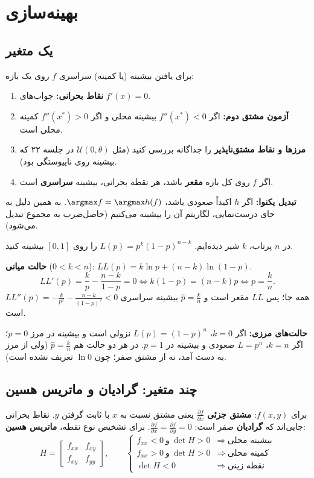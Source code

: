 \section{بهینه‌سازی}

\subsection{یک متغیر}
برای یافتن بیشینه (یا کمینه) سراسری $f$ روی یک بازه:
\begin{enumerate}
\item \textbf{نقاط بحرانی:} جواب‌های $f'(x)=0$.
\item \textbf{آزمون مشتق دوم:} اگر $f''(x^*)<0$ بیشینه محلی و اگر $f''(x^*)>0$ کمینه محلی است.
\item \textbf{مرزها و نقاط مشتق‌ناپذیر} را جداگانه بررسی کنید (مثل $\mathcal U(0,\theta)$ در جلسه ۲۲ که بیشینه روی ناپیوستگی بود).
\item اگر $f$ روی کل بازه \textbf{مقعر} باشد، هر نقطه بحرانی، بیشینه \textbf{سراسری} است.
\end{enumerate}
\textbf{تبدیل یکنوا:} اگر $h$ اکیداً صعودی باشد، $\argmax f=\argmax h(f)$. به همین دلیل به جای درست‌نمایی، لگاریتم آن را بیشینه می‌کنیم (حاصل‌ضرب به مجموع تبدیل می‌شود).

\begin{example}
در $n$ پرتاب، $k$ شیر دیده‌ایم. $L(p)=p^k(1-p)^{n-k}$ را روی $[0,1]$ بیشینه کنید.
\begin{solution}
\textbf{حالت میانی} ($0<k<n$): $LL(p)=k\ln p+(n-k)\ln(1-p)$.
\[
LL'(p)=\frac kp-\frac{n-k}{1-p}=0\iff k(1-p)=(n-k)p\iff p=\frac kn .
\]
$LL''(p)=-\frac{k}{p^2}-\frac{n-k}{(1-p)^2}<0$ همه جا؛ پس $LL$ مقعر است و $\hat p=\frac kn$ بیشینه سراسری است.

\textbf{حالت‌های مرزی:} اگر $k=0$، $L(p)=(1-p)^n$ نزولی است و بیشینه در مرز $p=0$؛ اگر $k=n$، $L=p^n$ صعودی و بیشینه در $p=1$. در هر دو حالت هم $\hat p=\frac kn$ (ولی از مرز به دست آمد، نه از مشتق صفر؛ چون $\ln0$ تعریف نشده است).
\end{solution}
\end{example}

\subsection{چند متغیر: گرادیان و ماتریس هسین}
برای $f(x,y)$: \textbf{مشتق جزئی} $\frac{\partial f}{\partial x}$ یعنی مشتق نسبت به $x$ با ثابت گرفتن $y$. نقاط بحرانی جایی‌اند که \textbf{گرادیان} صفر است: $\frac{\partial f}{\partial x}=\frac{\partial f}{\partial y}=0$. برای تشخیص نوع نقطه، \textbf{ماتریس هسین}:
\[
H=\begin{bmatrix}f_{xx}&f_{xy}\\f_{xy}&f_{yy}\end{bmatrix},\qquad
\begin{cases}
f_{xx}<0\ \text{و}\ \det H>0 & \Rightarrow\ \text{بیشینه محلی}\\
f_{xx}>0\ \text{و}\ \det H>0 & \Rightarrow\ \text{کمینه محلی}\\
\det H<0 & \Rightarrow\ \text{نقطه زینی}
\end{cases}
\]

